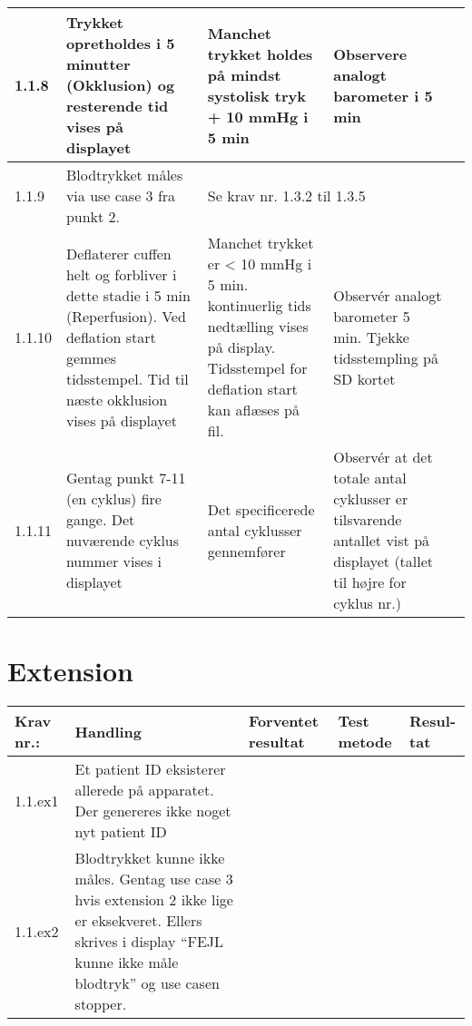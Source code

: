 \documentclass[11pt]{article}
\begin{document}
\begin{center}
\begin{longtable}{|p{1.5cm}|p{2cm}|p{3cm}|p{3cm}|p{1.1cm}|}
			1.1.8& Trykket opretholdes i 5 minutter (Okklusion) og resterende tid vises på displayet & Manchet trykket holdes på mindst systolisk tryk + 10 mmHg i 5 min & Observere analogt barometer i 5 min &  \\ \hline
			1.1.9& Blodtrykket måles via use case 3 fra punkt 2. & \multicolumn{3}{l|}{Se krav nr. 1.3.2 til 1.3.5}  \\ \hline
			1.1.10& Deflaterer cuffen helt og forbliver i dette stadie i 5 min (Reperfusion). Ved deflation start gemmes tidsstempel. Tid til næste okklusion vises på displayet & Manchet trykket er < 10 mmHg i 5 min. kontinuerlig tids nedtælling vises på display. Tidsstempel for deflation start kan aflæses på fil.  & Observér analogt barometer 5 min. Tjekke tidsstempling på SD kortet &  \\ \hline
			1.1.11& Gentag punkt 7-11 (en cyklus) fire gange. Det nuværende cyklus nummer vises i displayet & Det specificerede antal cyklusser gennemfører & Observér at det totale antal cyklusser er tilsvarende antallet vist på displayet (tallet til højre for cyklus nr.) &  \\ \hline 
		\end{longtable}
		\end{center}
		
		\chapter{Extension}
		\begin{center}
			\begin{longtable}{|p{1.5cm}|p{2cm}|p{3cm}|p{3cm}|p{1.1cm}|}
				\hline
				Krav nr.: & Handling & Forventet resultat & Test metode & Resul-tat  \\\hline
				1.1.ex1 & Et patient ID eksisterer allerede på apparatet. Der genereres ikke noget nyt patient ID & & &  \\
				\hline
				1.1.ex2 & Blodtrykket kunne ikke måles. Gentag use case 3 hvis extension 2 ikke lige er eksekveret. Ellers skrives i display “FEJL kunne ikke måle blodtryk” og use casen stopper.  & & & \\ \hline
			\end{longtable}
		\end{center}
\end{document}
